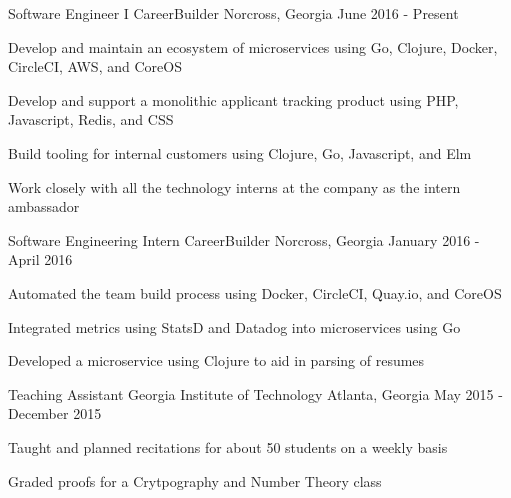 

\begin{cventries}

  \cventry
    {Software Engineer I} %
    {CareerBuilder} %
    {Norcross, Georgia} %
    {June 2016 - Present} %
    {
      \begin{cvitems} %
        \item {Develop and maintain an ecosystem of microservices using Go, Clojure, Docker, CircleCI, AWS, and CoreOS}
        \item{Develop and support a monolithic applicant tracking product using PHP, Javascript, Redis, and CSS}
        \item{Build tooling for internal customers using Clojure, Go, Javascript, and Elm}
        \item {Work closely with all the technology interns at the company as the intern ambassador} 
      \end{cvitems} 
    }


  \cventry
    {Software Engineering Intern} %
    {CareerBuilder} %
    {Norcross, Georgia} %
    {January 2016 - April 2016} %
    {
      \begin{cvitems} %
        \item {Automated the team build process using Docker, CircleCI, Quay.io, and CoreOS}
        \item {Integrated metrics using StatsD and Datadog into microservices using Go}
        \item {Developed a microservice using Clojure to aid in parsing of resumes}
      \end{cvitems}
    }

  \cventry
    {Teaching Assistant} %
    {Georgia Institute of Technology} %
    {Atlanta, Georgia} %
    {May 2015 - December 2015} %
    {
      \begin{cvitems} %
        \item {Taught and planned recitations for about 50 students on a weekly basis}
        \item{Graded proofs for a Crytpography and Number Theory class}
      \end{cvitems}
    }


\end{cventries}
